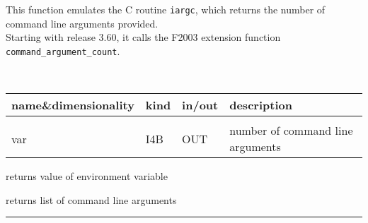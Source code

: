 \sloppy

 \section[nArguments]{ }
\label{sub:narguments}
\author{Eric Hivon}

\begin{facility}
{This function emulates the C routine {\tt iargc}, which returns the number of
command line arguments provided.\\
Starting with release 3.60, it calls the F2003 extension function \texttt{command\_argument\_count}.}
{\modExtension}
\end{facility}

\begin{f90function}
{\ }
\end{f90function}

\begin{arguments}
{
\begin{tabular}{p{0.3\hsize} p{0.05\hsize} p{0.1\hsize} p{0.45\hsize}} \hline  
\textbf{name\&dimensionality} & \textbf{kind} & \textbf{in/out} & \textbf{description} \\ \hline
                   &   &   &                           \\ %
var & I4B & OUT & number of command line arguments

\end{tabular}}
\end{arguments}


\begin{related}
  \begin{sulist}{} %
  \item[\htmlref{getEnvironment}{sub:getenvironment}] returns value of
  environment variable
  \item[\htmlref{getArgument}{sub:getargument}] returns list of command line arguments
  \end{sulist}
\end{related}

\rule{\hsize}{2mm}

\newpage
